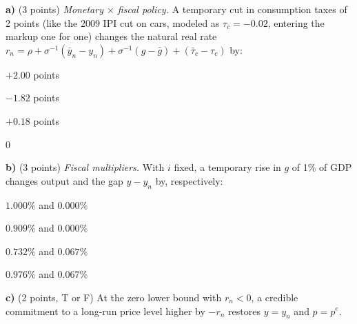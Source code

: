 \documentclass[11pt,a4paper]{article}
\begin{document}


\textbf{a)} (3 points) \emph{Monetary $\times$ fiscal policy.} A temporary cut in consumption taxes of 2 points (like the 2009 IPI
cut on cars, modeled as $\tau_c=-0.02$, entering the markup one for one) changes the natural real rate
$r_n=\rho+\sigma^{-1}(\bar y_n-y_n)+\sigma^{-1}(g-\bar g)+(\bar\tau_c-\tau_c)$ by:
\begin{alternativas}
\item $+2.00$ points
\item $-1.82$ points
\item $+0.18$ points
\item $0$
\end{alternativas}
\begin{sol}
\end{sol}

\medskip
\textbf{b)} (3 points) \emph{Fiscal multipliers.} With $i$ fixed, a temporary rise in $g$ of 1\% of GDP changes output and the gap
$y-y_n$ by, respectively:
\begin{alternativas}
\item $1.000\%$ and $0.000\%$
\item $0.909\%$ and $0.000\%$
\item $0.732\%$ and $0.067\%$
\item $0.976\%$ and $0.067\%$
\end{alternativas}
\begin{sol}
\end{sol}

\medskip
\textbf{c)} (2 points, T or F) At the zero lower bound with $r_n<0$, a credible commitment to a long-run price level higher
by $-r_n$ restores $y=y_n$ and $p=p^e$.
\begin{sol}
\end{sol}
\end{document}
